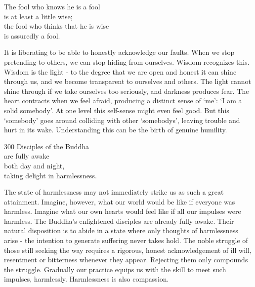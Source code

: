 
\begin{dhpVerse}{63}
\label{dhp-63}
The fool who knows he is a fool\\
is at least a little wise;\\
the fool who thinks that he is wise\\
is assuredly a fool.
\end{dhpVerse}

\begin{dhpRefl}
It is liberating to be able to honestly acknowledge our faults. When we stop pretending to others, we can stop hiding from ourselves. Wisdom recognizes this. Wisdom is the light - to the degree that we are open and honest it can shine through us, and we become transparent to ourselves and others. The light cannot shine through if we take ourselves too seriously, and darkness produces fear. The heart contracts when we feel afraid, producing a distinct sense of `me': `I am a solid somebody'. At one level this self-sense might even feel good. But this `somebody' goes around colliding with other `somebodys', leaving trouble and hurt in its wake. Understanding this can be the birth of genuine humility.
\end{dhpRefl}


\begin{dhpVerse}{300}
\label{dhp-300}
Disciples of the Buddha\\
are fully awake\\
both day and night,\\
taking delight in harmlessness.
\end{dhpVerse}

\begin{dhpRefl}
The state of harmlessness may not immediately strike us as such a great attainment. Imagine, however, what our world would be like if everyone was harmless. Imagine what our own hearts would feel like if all our impulses were harmless. The Buddha's enlightened disciples are already fully awake. Their natural disposition is to abide in a state where only thoughts of harmlessness arise - the intention to generate suffering never takes hold. The noble struggle of those still seeking the way requires a rigorous, honest acknowledgement of ill will, resentment or bitterness whenever they appear. Rejecting them only compounds the struggle. Gradually our practice equips us with the skill to meet such impulses, harmlessly. Harmlessness is also compassion.
\end{dhpRefl}

